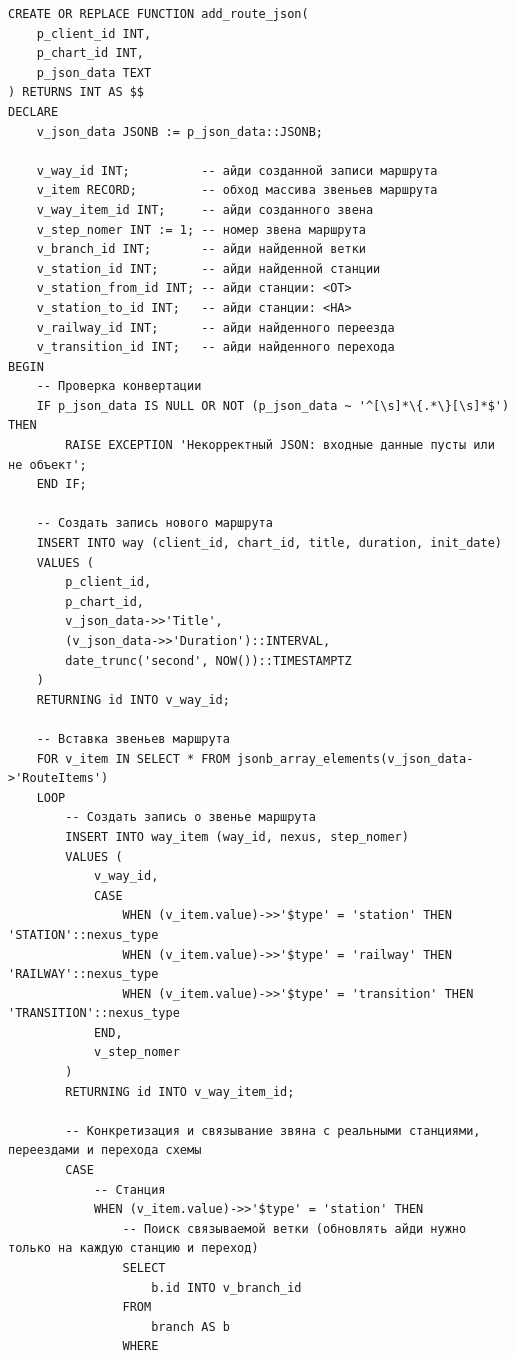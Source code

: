 \clearpage

\begin{lstlisting}[label=lst:add_route_json:1,caption=Реализация функции добавления маршрута (часть 1),firstnumber=1]
CREATE OR REPLACE FUNCTION add_route_json(
    p_client_id INT,
    p_chart_id INT,
    p_json_data TEXT
) RETURNS INT AS $$
DECLARE
    v_json_data JSONB := p_json_data::JSONB;

    v_way_id INT;          -- айди созданной записи маршрута
    v_item RECORD;         -- обход массива звеньев маршрута  
    v_way_item_id INT;     -- айди созданного звена
    v_step_nomer INT := 1; -- номер звена маршрута
    v_branch_id INT;       -- айди найденной ветки
    v_station_id INT;      -- айди найденной станции
    v_station_from_id INT; -- айди станции: <ОТ>
    v_station_to_id INT;   -- айди станции: <НА>
    v_railway_id INT;      -- айди найденного переезда
    v_transition_id INT;   -- айди найденного перехода
BEGIN
    -- Проверка конвертации
    IF p_json_data IS NULL OR NOT (p_json_data ~ '^[\s]*\{.*\}[\s]*$') THEN
        RAISE EXCEPTION 'Некорректный JSON: входные данные пусты или не объект';
    END IF;

    -- Создать запись нового маршрута
    INSERT INTO way (client_id, chart_id, title, duration, init_date)
    VALUES (
        p_client_id,
        p_chart_id,
        v_json_data->>'Title',
        (v_json_data->>'Duration')::INTERVAL,
        date_trunc('second', NOW())::TIMESTAMPTZ
    )
    RETURNING id INTO v_way_id;

    -- Вставка звеньев маршрута
    FOR v_item IN SELECT * FROM jsonb_array_elements(v_json_data->'RouteItems')
    LOOP
        -- Создать запись о звенье маршрута
        INSERT INTO way_item (way_id, nexus, step_nomer)
        VALUES (
            v_way_id,
            CASE 
                WHEN (v_item.value)->>'$type' = 'station' THEN 'STATION'::nexus_type
                WHEN (v_item.value)->>'$type' = 'railway' THEN 'RAILWAY'::nexus_type
                WHEN (v_item.value)->>'$type' = 'transition' THEN 'TRANSITION'::nexus_type
            END,
            v_step_nomer
        )
        RETURNING id INTO v_way_item_id;

        -- Конкретизация и связывание звяна с реальными станциями, переездами и перехода схемы
        CASE
            -- Станция
            WHEN (v_item.value)->>'$type' = 'station' THEN
                -- Поиск связываемой ветки (обновлять айди нужно только на каждую станцию и переход)
                SELECT
                    b.id INTO v_branch_id
                FROM 
                    branch AS b
                WHERE
\end{lstlisting}

